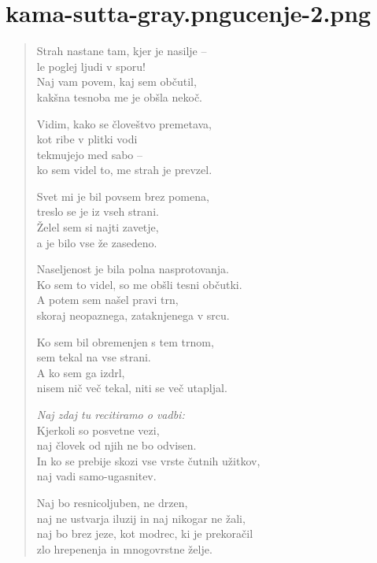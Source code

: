 
\chapter[Attadaṇḍa Sutta]{{kama-sutta-gray.png}{ucenje-2.png}}


\begin{verse}


Strah nastane tam, kjer je nasilje --\\
le poglej ljudi v sporu!\\
Naj vam povem, kaj sem občutil,\\
kakšna tesnoba me je obšla nekoč.

Vidim, kako se človeštvo premetava,\\
kot ribe v plitki vodi\\
tekmujejo med sabo --\\
ko sem videl to, me strah je prevzel.

Svet mi je bil povsem brez pomena,\\
treslo se je iz vseh strani.\\
Želel sem si najti zavetje,\\
a je bilo vse že zasedeno.

Naseljenost je bila polna nasprotovanja.\\
Ko sem to videl, so me obšli tesni občutki.\\
A potem sem našel pravi trn,\\
skoraj neopaznega, zataknjenega v srcu.

Ko sem bil obremenjen s tem trnom,\\
sem tekal na vse strani.\\
A ko sem ga izdrl,\\
nisem nič več tekal, niti se več utapljal.

\emph{Naj zdaj tu recitiramo o vadbi:}\\
Kjerkoli so posvetne vezi,\\
naj človek od njih ne bo odvisen.\\
In ko se prebije skozi vse vrste čutnih užitkov,\\
naj vadi samo-ugasnitev.

Naj bo resnicoljuben, ne drzen,\\
naj ne ustvarja iluzij in naj nikogar ne žali,\\
naj bo brez jeze, kot modrec, ki je prekoračil\\
zlo hrepenenja in mnogovrstne želje.


\end{verse}
